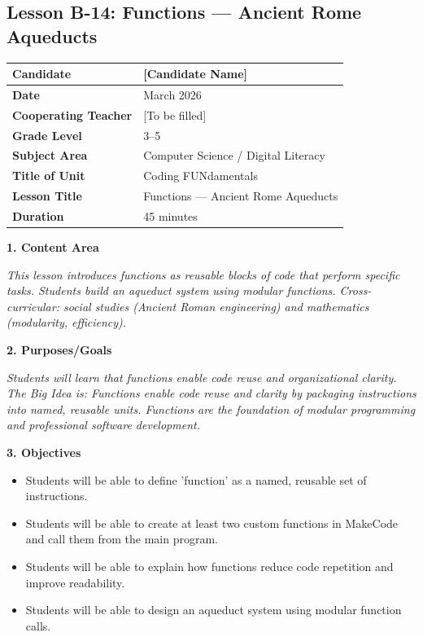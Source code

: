 \documentclass[11pt,letterpaper]{article}
\begin{document}
\newpage
\subsection{Lesson B-14: Functions --- Ancient Rome Aqueducts}
\label{sub:LessonB14FunctionsAncientRomeAqueducts}

\begin{longtable}{|L{0.28\textwidth}|L{0.65\textwidth}|}
\hline
\textbf{Candidate}  & [Candidate Name]  \\
\hline
\textbf{Date}  & March 2026  \\
\hline
\textbf{Cooperating Teacher}  & [To be filled]  \\
\hline
\textbf{Grade Level}  & 3--5  \\
\hline
\textbf{Subject Area}  & Computer Science / Digital Literacy  \\
\hline
\textbf{Title of Unit}  & Coding FUNdamentals  \\
\hline
\textbf{Lesson Title}  & Functions --- Ancient Rome Aqueducts  \\
\hline
\textbf{Duration}  & 45 minutes  \\
\hline
\end{longtable}

\textbf{1. Content Area}

\textit{This lesson introduces functions as reusable blocks of code that perform specific tasks. Students build an aqueduct system using modular functions. Cross-curricular: social studies (Ancient Roman engineering) and mathematics (modularity, efficiency).}

\textbf{2. Purposes/Goals}

\textit{Students will learn that functions enable code reuse and organizational clarity. The Big Idea is: Functions enable code reuse and clarity by packaging instructions into named, reusable units. Functions are the foundation of modular programming and professional software development.}

\textbf{3. Objectives}

\begin{itemize}
  \item Students will be able to define 'function' as a named, reusable set of instructions.

  \item Students will be able to create at least two custom functions in MakeCode and call them from the main program.

  \item Students will be able to explain how functions reduce code repetition and improve readability.

  \item Students will be able to design an aqueduct system using modular function calls.
\end{itemize}
\end{document}

